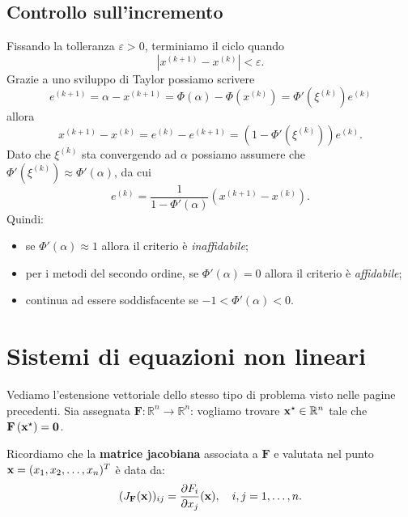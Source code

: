 \subsection{Controllo sull'incremento}
Fissando la tolleranza $\varepsilon  >0$, terminiamo il ciclo quando
\begin{equation*}
\left| x^{( k+1)} -x^{(k)}\right| < \varepsilon.
\end{equation*}
Grazie a uno sviluppo di Taylor possiamo scrivere
\begin{equation*}
e^{( k+1)} =\alpha -x^{( k+1)} =\Phi ( \alpha ) -\Phi \left( x^{( k)}\right) =\Phi '\left( \xi ^{( k)}\right) e^{( k)}
\end{equation*}
allora
\begin{equation*}
x^{( k+1)} -x^{( k)} =e^{( k)} -e^{( k+1)} =\left( 1-\Phi '\left( \xi ^{( k)}\right)\right) e^{( k)}.
\end{equation*}
Dato che $\xi ^{( k)}$ sta convergendo ad $\alpha $ possiamo assumere che $\Phi '\left( \xi ^{( k)}\right) \approx \Phi '( \alpha )$, da cui
\begin{equation}
e^{( k)} =\frac{1}{1-\Phi '( \alpha )}\left( x^{( k+1)} -x^{( k)}\right).
\end{equation}
Quindi:
\begin{itemize}
\item se $\Phi '( \alpha ) \approx 1$ allora il criterio è \textit{inaffidabile};
\item per i metodi del secondo ordine, se $\Phi '( \alpha ) =0$ allora il criterio è \textit{affidabile};
\item continua ad essere soddisfacente se $-1< \Phi '( \alpha ) < 0$.
\end{itemize}

\section{Sistemi di equazioni non lineari}
Vediamo l'estensione vettoriale dello stesso tipo di problema visto nelle pagine precedenti.
Sia assegnata $\mathbf{F} :\mathbb{R}^{n}\rightarrow \mathbb{R}^{n}$: vogliamo trovare $\mathbf{x}^{\star } \in \mathbb{R}^{n}$ tale che $\mathbf{F}\left(\mathbf{x}^{\star }\right) =\mathbf{0}$.

Ricordiamo che la \textbf{matrice jacobiana} associata a $\mathbf{F}$ e valutata nel punto $\mathbf{x} =( x_{1} ,x_{2} ,\dotsc ,x_{n})^{T}$ è data da:
\begin{equation*}
( J_{\mathbf{F}}(\mathbf{x}))_{ij} =\frac{\partial F_{i}}{\partial x_{j}}(\mathbf{x}) ,\quad i,j=1,\dotsc ,n.
\end{equation*}

